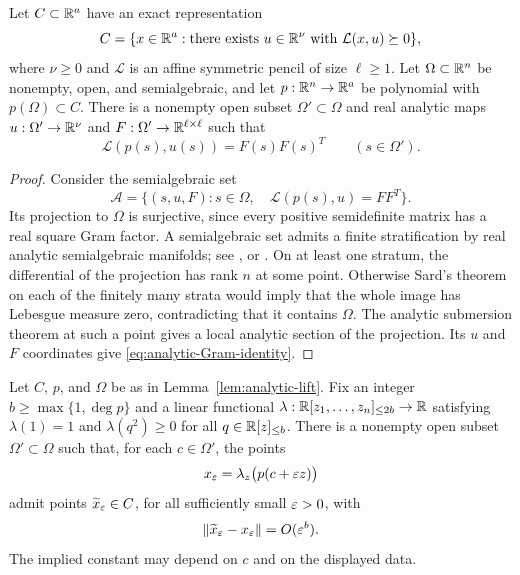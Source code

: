 \begin{lemma}
 \label{lem:analytic-lift}
Let $C\subset\mathbb R^a$ have an exact representation
\[
 C=\{x\in\mathbb R^a:\text{there exists }u\in\mathbb R^\nu
                         \text{ with }\mathcal L(x,u)\succeq0\},
\]
where $\nu\ge0$ and $\mathcal L$ is an affine symmetric pencil of size
$\ell\ge1$.
Let $\Omega\subset\mathbb R^n$ be nonempty, open, and semialgebraic, and let
$p:\mathbb R^n\to\mathbb R^a$ be polynomial with $p(\Omega)\subset C$.
There is a nonempty open subset $\Omega'\subset\Omega$ and real analytic
maps $u:\Omega'\to\mathbb R^\nu$ and
$F:\Omega'\to\mathbb R^{\ell\times\ell}$ such that
\begin{equation}
 \label{eq:analytic-Gram-identity}
 \mathcal L(p(s),u(s))=F(s)F(s)^T\qquad(s\in\Omega').
\end{equation}
\end{lemma}

\begin{proof}
Consider the semialgebraic set
\[
 \mathcal A=\{(s,u,F):s\in\Omega,\quad
                  \mathcal L(p(s),u)=FF^T\}.
\]
Its projection to $\Omega$ is surjective, since every positive
semidefinite matrix has a real square Gram factor.  A semialgebraic set
admits a finite stratification by real analytic semialgebraic manifolds;
see \cite[Proposition~9.1.8]{BCR1998}, or
\cite[Section~2.2.2]{LRT2025}.  On at least one stratum, the differential
of the projection has rank $n$ at some point.  Otherwise Sard's theorem
on each of the finitely many strata would imply that the whole image has
Lebesgue measure zero, contradicting that it contains $\Omega$.
The analytic submersion theorem at such a point gives a local analytic
section of the projection.  Its $u$ and $F$ coordinates give
\eqref{eq:analytic-Gram-identity}.
\end{proof}

\begin{lemma}
 \label{lem:moment-near-feasibility}
Let $C$, $p$, and $\Omega$ be as in Lemma~\ref{lem:analytic-lift}.
Fix an integer $b\ge\max\{1,\deg p\}$ and a linear functional
$\lambda:\mathbb R[z_1,\ldots,z_n]_{\le2b}\to\mathbb R$ satisfying
$\lambda(1)=1$ and $\lambda(q^2)\ge0$ for all
$q\in\mathbb R[z]_{\le b}$.  There is a nonempty open subset
$\Omega'\subset\Omega$ such that, for each $c\in\Omega'$, the points
\[
 x_\varepsilon=\lambda_z\bigl(p(c+\varepsilon z)\bigr)
\]
admit points $\widetilde x_\varepsilon\in C$, for all sufficiently small
$\varepsilon>0$, with
\begin{equation}
 \label{eq:near-feasibility}
 \|\widetilde x_\varepsilon-x_\varepsilon\|=O(\varepsilon^b).
\end{equation}
The implied constant may depend on $c$ and on the displayed data.
\end{lemma}

